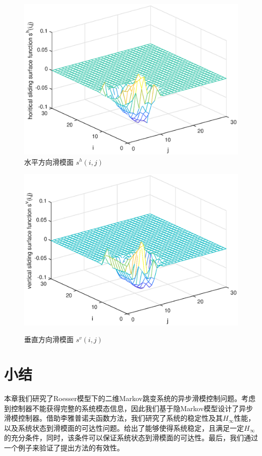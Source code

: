 	\begin{figure}[!htb]
		\centering\includegraphics[scale=0.6]{./figures/2dsmc/simulations/hs_eps.eps}
		\caption{水平方向滑模面 $s^{h}(i,j)$}
		\label{fig9}
	\end{figure}
	\begin{figure}[!htb]
		\centering\includegraphics[scale=0.6]{./figures/2dsmc/simulations/vs_eps.eps}\\ 
		\caption{垂直方向滑模面 $s^{v}(i,j)$}
		\label{fig10}
	\end{figure}

\section{小结} \label{conclusion} 	
	本章我们研究了Roesser模型下的二维Markov跳变系统的异步滑模控制问题。考虑到控制器不能获得完整的系统模态信息，因此我们基于隐Markov模型设计了异步滑模控制器。借助李雅普诺夫函数方法，我们研究了系统的稳定性及其$H_{\infty}$性能，以及系统状态到滑模面的可达性问题。给出了能够使得系统稳定，且满足一定$H_{\infty}$的充分条件，同时，该条件可以保证系统状态到滑模面的可达性。最后，我们通过一个例子来验证了提出方法的有效性。
	